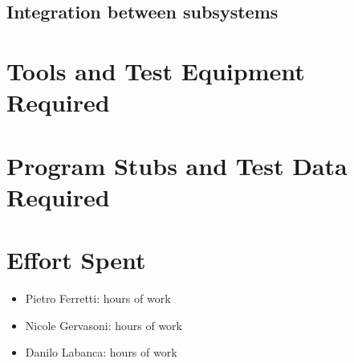 \documentclass[english]{article}
\begin{document}
\subsection{Integration between subsystems}

\section{Tools and Test Equipment Required}

\section{Program Stubs and Test Data Required}


\section{Effort Spent}
\begin{itemize}
	\item{Pietro Ferretti:  hours of work}
	\item{Nicole Gervasoni:  hours of work}
	\item{Danilo Labanca:  hours of work}
\end{itemize}
\end{document}
